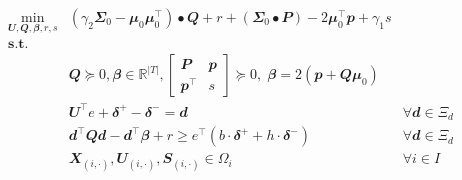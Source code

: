 \documentclass[
  a4paper,
,tablecaptionabove
]{scrartcl}
\numberwithin{equation}{section}
\begin{document}
\[\begin{aligned}
    \min_{\mathbfit{U}, \mathbfit{Q}, \mathbfit{\beta}, r, s} & \left(\gamma_{2} \mathbfit{\Sigma}_{0}-\mathbfit{\mu}_{0} \mathbfit{\mu}_{0}^{\top}\right) \bullet \mathbfit{Q}+r+\left(\mathbfit{\Sigma}_{0} \bullet \mathbfit{P}\right)-2 \mathbfit{\mu}_{0}^{\top} \mathbfit{p} + \gamma_{1} s                                 \\
    \mathbf { s.t. }                                          &                                                                                                                                                                                                                                                                   \\
                                                              & \mathbfit{Q} \succeq 0, \mathbfit{\beta} \in \mathbb{R}^{|T|},
    \begin{bmatrix}
      \mathbfit{P}      & \mathbfit{p} \\
      \mathbfit{p}^\top & s
    \end{bmatrix} \succeq 0, \;
    \mathbfit \beta = 2 (\mathbfit p + \mathbfit{Q\mu}_0)                                                                                                                                                                                                                                                                         \\
                                                              & \mathbfit{U} ^\top e + \mathbfit \delta^+ - \mathbfit \delta^-  = \mathbfit d                                                                                                                                                     & \forall \mathbfit d \in \Xi_d \\
                                                              & \mathbfit{d}^{\top} \mathbfit{Q} \mathbfit{d} -\mathbfit{d^\top\beta} + r \ge e^\top( b \cdot\mathbfit{\delta^+}  + h\cdot \mathbfit \delta^-)                                                                                    & \forall \mathbfit d \in \Xi_d \\
                                                              & \mathbfit X_{(i,\cdot)}, \mathbfit U_{(i,\cdot)}, \mathbfit S_{(i,\cdot)} \in \Omega_i                                                                                                                                            & \forall i\in I
  \end{aligned}\]
\end{document}
